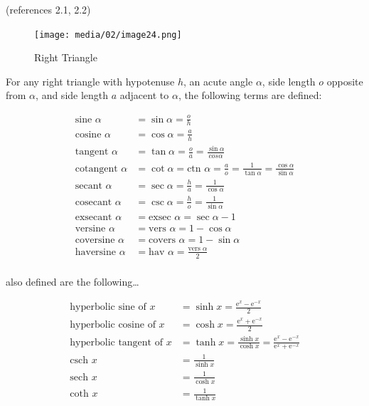 \documentclass[
]{book}
\begin{document}
(references 2.1, 2.2)

\begin{figure}
\centering
\texttt{[image: media/02/image24.png]}
\caption{Right Triangle}
\end{figure}

For any right triangle with hypotenuse \(h\), an acute angle \(\alpha\), side length \(o\) opposite from \(\alpha\), and side length \(a\) adjacent to \(\alpha\), the following terms are defined:

\begin{align}
\text{sine } \alpha &= \sin{\alpha} = \frac{o}{h} \\
\text{cosine } \alpha &= \cos{\alpha} = \frac{a}{h} \\
\text{tangent } \alpha &= \tan{\alpha} = \frac{o}{a} = \frac{\sin{\alpha}}{cos{\alpha}} \\
\text{cotangent } \alpha &= \cot{\alpha} = \text{ctn } \alpha = \frac{a}{o} = \frac{1}{\tan{\alpha}} = \frac{\cos{\alpha}}{\sin{\alpha}} \\
\text{secant } \alpha &= \sec{\alpha} = \frac{h}{a} = \frac{1}{\cos{\alpha}} \\
\text{cosecant } \alpha &= \csc{\alpha} = \frac{h}{o} = \frac{1}{\sin{\alpha}} \\
\text{exsecant } \alpha &= \text{exsec } \alpha = \sec{\alpha} - 1 \\
\text{versine } \alpha &= \text{vers } \alpha = 1 - \cos{\alpha} \\
\text{coversine } \alpha &= \text{covers } \alpha = 1 - \sin{\alpha} \\
\text{haversine } \alpha &= \text{hav } \alpha = \frac{\text{vers } \alpha}{2} \\
\end{align}

also defined are the following\ldots{}

\begin{align}
\text{hyperbolic sine of } x &= \sinh{x} = \frac{\mathrm{e}^x - \mathrm{e}^{-x}}{2} \\
\text{hyperbolic cosine of } x &= \cosh{x} = \frac{\mathrm{e}^x + \mathrm{e}^{-x}}{2} \\
\text{hyperbolic tangent of } x &= \tanh{x} = \frac{\sinh{x}}{\cosh{x}} = \frac{\mathrm{e}^x - \mathrm{e}^{-x}}{\mathrm{e}^x + \mathrm{e}^{-x}} \\
\text{csch } x &= \frac{1}{\sinh{x}} \\
\text{sech } x &= \frac{1}{\cosh{x}} \\
\text{coth } x &= \frac{1}{\tanh{x}} \\
\end{align}
\end{document}
